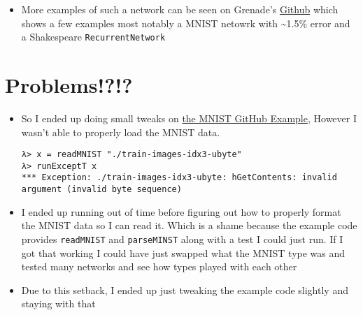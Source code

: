 \documentclass{article}
\begin{document}
\begin{itemize}
\item More examples of such a network can be seen on Grenade's \href{https://github.com/HuwCampbell/grenade}{Github}
which shows a few examples most notably a MNIST netowrk with \textasciitilde{}1.5\%
error and a Shakespeare \texttt{RecurrentNetwork}
\end{itemize}

\section{Problems!?!?}
\label{sec-2}
\begin{itemize}
\item So Ι ended up doing small tweaks on \href{https://github.com/HuwCampbell/grenade/blob/master/examples/main/mnist.hs}{the MNIST GitHub Example},
However I wasn't able to properly load the MNIST data.
\begin{verbatim}
λ> x = readMNIST "./train-images-idx3-ubyte"
λ> runExceptT x
*** Exception: ./train-images-idx3-ubyte: hGetContents: invalid argument (invalid byte sequence)
\end{verbatim}
\item I ended up running out of time before figuring out how to properly
format the MNIST data so Ι can read it. Which is a shame because the
example code provides \texttt{readMNIST} and \texttt{parseMINST} along with a test I
could just run. If I got that working I could have just swapped what
the MNIST type was and tested many networks and see how types played
with each other
\item Due to this setback, I ended up just tweaking the example code
slightly and staying with that
\end{itemize}
\end{document}
